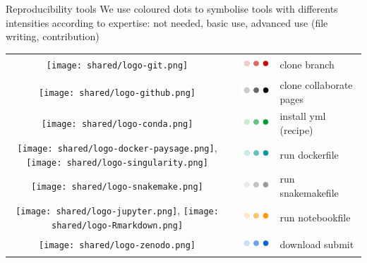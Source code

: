 \begin{frame}{Reproducibility tools}
We use coloured dots to symbolise tools with differents intensities according to expertise: not needed, basic use, advanced use (file writing, contribution)
\begin{center}
\begin{tabular}{|c|c|l|}
   \hline
   \texttt{[image: shared/logo-git.png]} & \includegraphics[height=0.6cm]{10_usecases/images/FAIR_dots_git.png} & clone branch \\
   \texttt{[image: shared/logo-github.png]} & \includegraphics[height=0.6cm]{10_usecases/images/FAIR_dots_github.png} & clone collaborate pages\\
   \texttt{[image: shared/logo-conda.png]} & \includegraphics[height=0.6cm]{10_usecases/images/FAIR_dots_conda.png} & install yml (recipe)\\
   \texttt{[image: shared/logo-docker-paysage.png]}, \texttt{[image: shared/logo-singularity.png]} & \includegraphics[height=0.6cm]{10_usecases/images/FAIR_dots_docker.png} & run dockerfile\\
   \texttt{[image: shared/logo-snakemake.png]} & \includegraphics[height=0.6cm]{10_usecases/images/FAIR_dots_smk.png} & run snakemakefile\\
   \texttt{[image: shared/logo-jupyter.png]}, \texttt{[image: shared/logo-Rmarkdown.png]} & \includegraphics[height=0.6cm]{10_usecases/images/FAIR_dots_jupiter.png} & run notebookfile \\
   \texttt{[image: shared/logo-zenodo.png]} & \includegraphics[height=0.6cm]{10_usecases/images/FAIR_dots_zenodo.png} & download submit\\
   \hline
\end{tabular}
\end{center}
\end{frame}
